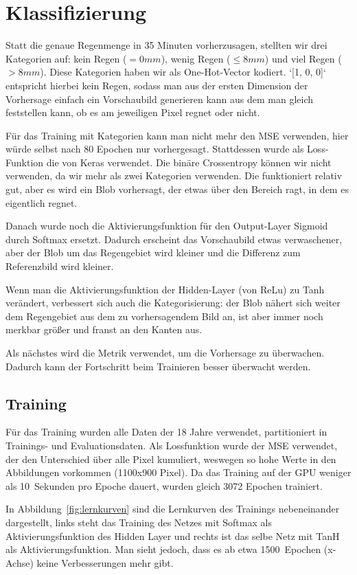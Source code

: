 \section{Klassifizierung}
Statt die genaue Regenmenge in 35 Minuten vorherzusagen, stellten wir drei Kategorien auf: kein Regen ($= 0mm$), wenig Regen ($\leq 8mm$) und viel Regen ($> 8mm$). Diese Kategorien haben wir als One-Hot-Vector kodiert. `[1, 0, 0]` entspricht hierbei kein Regen, sodass man aus der ersten Dimension der Vorhersage einfach ein Vorschaubild generieren kann aus dem man gleich feststellen kann, ob es am jeweiligen Pixel regnet oder nicht.

Für das Training mit Kategorien kann man nicht mehr den MSE verwenden, hier würde selbst nach 80 Epochen nur  vorhergesagt. Stattdessen wurde als Loss-Funktion die  von Keras verwendet. Die binäre Crossentropy können wir nicht verwenden, da wir mehr als zwei Kategorien verwenden. Die  funktioniert relativ gut, aber es wird ein Blob vorhersagt, der etwas über den Bereich ragt, in dem es eigentlich regnet.

Danach wurde noch die Aktivierungsfunktion für den Output-Layer Sigmoid durch Softmax ersetzt. Dadurch erscheint das Vorschaubild etwas verwaschener, aber der Blob um das Regengebiet wird kleiner und die Differenz zum Referenzbild wird kleiner.

Wenn man die Aktivierungsfunktion der Hidden-Layer (von ReLu) zu Tanh verändert, verbessert sich auch die Kategorisierung: der Blob nähert sich weiter dem Regengebiet aus dem zu vorhersagendem Bild an, ist aber immer noch merkbar größer und franst an den Kanten aus.

Als nächstes wird die Metrik  verwendet, um die Vorhersage zu überwachen. Dadurch kann der Fortschritt beim Trainieren besser überwacht werden.


\subsection{Training}
Für das Training wurden alle Daten der 18 Jahre verwendet, partitioniert in Trainings- und Evaluationsdaten. Als Lossfunktion wurde der MSE verwendet, der den Unterschied über alle Pixel kumuliert, weswegen so hohe Werte in den Abbildungen vorkommen (1100x900 Pixel). Da das Training auf der GPU weniger als 10~Sekunden pro Epoche dauert, wurden gleich 3072 Epochen trainiert.

In Abbildung~\ref{fig:lernkurven} sind die Lernkurven des Trainings nebeneinander dargestellt, links steht das Training des Netzes mit Softmax als Aktivierungsfunktion des Hidden Layer und rechts ist das selbe Netz mit TanH als Aktivierungsfunktion. Man sieht jedoch, dass es ab etwa 1500~Epochen (x-Achse) keine Verbesserungen mehr gibt.


